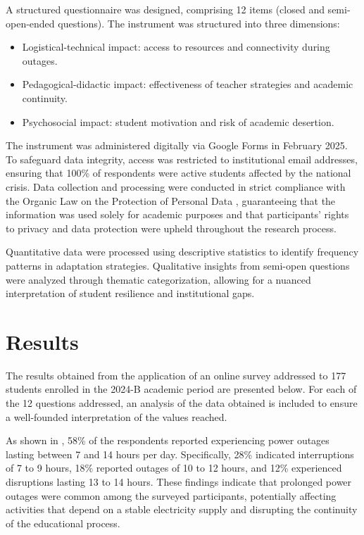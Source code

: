 \documentclass[english]{textolivre}
\begin{document}
A structured questionnaire was designed, comprising 12 items (closed and semi-open-ended questions). The instrument was structured into three dimensions:

\begin{itemize}
    \item Logistical-technical impact: access to resources and connectivity during outages.
    \item Pedagogical-didactic impact: effectiveness of teacher strategies and academic continuity.
    \item Psychosocial impact: student motivation and risk of academic desertion.
\end{itemize}

The instrument was administered digitally via Google Forms in February 2025. To safeguard data integrity, access was restricted to institutional email addresses, ensuring that 100\% of respondents were active students affected by the national crisis. Data collection and processing were conducted in strict compliance with the Organic Law on the Protection of Personal Data \cite{ecuador2021lopdp}, guaranteeing that the information was used solely for academic purposes and that participants’ rights to privacy and data protection were upheld throughout the research process.

Quantitative data were processed using descriptive statistics to identify frequency patterns in adaptation strategies. Qualitative insights from semi-open questions were analyzed through thematic categorization, allowing for a nuanced interpretation of student resilience and institutional gaps.


\section{Results}\label{sec-fmt-manuscrito}
The results obtained from the application of an online survey addressed to 177 students enrolled in the 2024-B academic period are presented below. For each of the 12 questions addressed, an analysis of the data obtained is included to ensure a well-founded interpretation of the values reached.

As shown in , 58\% of the respondents reported experiencing power outages lasting between 7 and 14 hours per day. Specifically, 28\% indicated interruptions of 7 to 9 hours, 18\% reported outages of 10 to 12 hours, and 12\% experienced disruptions lasting 13 to 14 hours. These findings indicate that prolonged power outages were common among the surveyed participants, potentially affecting activities that depend on a stable electricity supply and disrupting the continuity of the educational process.
\end{document}
